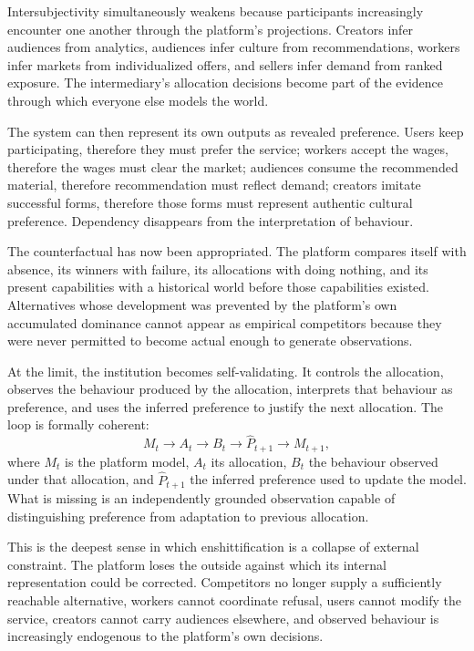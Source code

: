 \documentclass[11pt]{article}
\begin{document}
Intersubjectivity simultaneously weakens because participants increasingly encounter one another through the platform's projections. Creators infer audiences from analytics, audiences infer culture from recommendations, workers infer markets from individualized offers, and sellers infer demand from ranked exposure. The intermediary's allocation decisions become part of the evidence through which everyone else models the world.

The system can then represent its own outputs as revealed preference. Users keep participating, therefore they must prefer the service; workers accept the wages, therefore the wages must clear the market; audiences consume the recommended material, therefore recommendation must reflect demand; creators imitate successful forms, therefore those forms must represent authentic cultural preference. Dependency disappears from the interpretation of behaviour.

The counterfactual has now been appropriated. The platform compares itself with absence, its winners with failure, its allocations with doing nothing, and its present capabilities with a historical world before those capabilities existed. Alternatives whose development was prevented by the platform's own accumulated dominance cannot appear as empirical competitors because they were never permitted to become actual enough to generate observations.

At the limit, the institution becomes self-validating. It controls the allocation, observes the behaviour produced by the allocation, interprets that behaviour as preference, and uses the inferred preference to justify the next allocation. The loop is formally coherent:
\[
M_t
\rightarrow
A_t
\rightarrow
B_t
\rightarrow
\widehat{P}_{t+1}
\rightarrow
M_{t+1},
\]
where \(M_t\) is the platform model, \(A_t\) its allocation, \(B_t\) the behaviour observed under that allocation, and \(\widehat{P}_{t+1}\) the inferred preference used to update the model. What is missing is an independently grounded observation capable of distinguishing preference from adaptation to previous allocation.

This is the deepest sense in which enshittification is a collapse of external constraint. The platform loses the outside against which its internal representation could be corrected. Competitors no longer supply a sufficiently reachable alternative, workers cannot coordinate refusal, users cannot modify the service, creators cannot carry audiences elsewhere, and observed behaviour is increasingly endogenous to the platform's own decisions.
\end{document}
